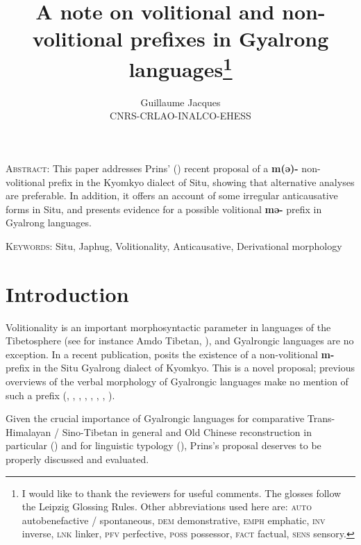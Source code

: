 \documentclass[oneside,a4paper,11pt]{article}
\newcommand{\ipa}[1]{\textbf{{\phon\mbox{#1}}}} %
\begin{document}
\title{A note on volitional and non-volitional prefixes in Gyalrong languages\footnote{I would like to thank the reviewers for useful comments. The glosses follow the Leipzig Glossing Rules. Other abbreviations used here are:  \textsc{auto} autobenefactive / spontaneous,  \textsc{dem} demonstrative,  \textsc{emph} emphatic, \textsc{inv} inverse,  \textsc{lnk} linker, \textsc{pfv} perfective, \textsc{poss} possessor, \textsc{fact} factual,  \textsc{sens} sensory. }}
\author{Guillaume Jacques\\CNRS-CRLAO-INALCO-EHESS}
\maketitle

\textsc{Abstract}: This paper addresses Prins' (\citeyear{prins16kyomkyo}) recent proposal of a \ipa{m(ə)-} non-volitional prefix in the Kyomkyo dialect of Situ, showing that alternative analyses are preferable. In addition, it offers an account of some irregular anticausative forms in Situ, and presents evidence for a possible volitional \ipa{mə-} prefix in Gyalrong languages.

\textsc{Keywords}: Situ, Japhug, Volitionality, Anticausative, Derivational morphology

\section*{Introduction}
Volitionality is an important morphosyntactic parameter in languages of the Tibetosphere (see for instance Amdo Tibetan, \citealt[960-3]{sun93evidentiality}), and Gyalrongic languages are no exception. In a recent publication, \citet[505-6]{prins16kyomkyo} posits the existence of a non-volitional \ipa{m-} prefix in the Situ Gyalrong dialect of Kyomkyo. This is a novel proposal; previous overviews of the verbal  morphology of Gyalrongic languages make no mention of such a prefix (\citealt{jackson06paisheng}, \citealt{jacques12demotion}, \citealt{jackson14morpho},  \citealt{linyj16cogtse}, \citealt{jackson17tshobdun}, \citealt{nagano17cogtse}, \citealt{jacques17sketch}, \citealt{lai17khroskyabs}).

Given the crucial importance of Gyalrongic languages for comparative Trans-Himalayan / Sino-Tibetan in general and Old Chinese reconstruction in particular (\citealt{gong17xingtaixue, gong17clusters}) and for linguistic typology (\citealt{jacques13harmonization, jacques14antipassive}), Prins's proposal deserves to be properly discussed and  evaluated.
\end{document}
